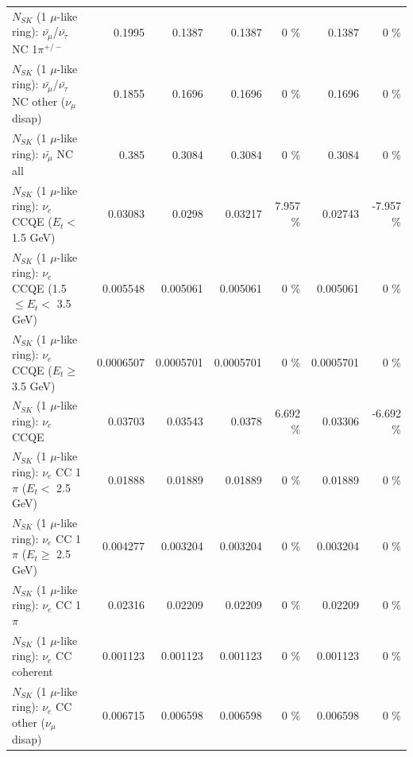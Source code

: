 \begin{table}
\begin{tabular}{| l | r | r | r  r | r  r |}
\hline
  $N_{SK}$ (1 $\mu$-like ring): $\bar{\nu_\mu}$/$\bar{\nu_\tau}$ NC 1$\pi^{+/-}$ &          0.1995 &          0.1387 &          0.1387 &        0 \%  &          0.1387 &        0 \%  \\ 
$N_{SK}$ (1 $\mu$-like ring): $\bar{\nu_\mu}$/$\bar{\nu_\tau}$ NC other ($\nu_\mu$ disap) &          0.1855 &          0.1696 &          0.1696 &        0 \%  &          0.1696 &        0 \%  \\ 
                          $N_{SK}$ (1 $\mu$-like ring): $\bar{\nu_{\mu}}$ NC all &           0.385 &          0.3084 &          0.3084 &        0 \%  &          0.3084 &        0 \%  \\ 
\hline
\hline
\hline
                  $N_{SK}$ (1 $\mu$-like ring): $\nu_e$ CCQE ($E_{t} <$ 1.5 GeV) &         0.03083 &          0.0298 &         0.03217 &    7.957 \%  &         0.02743 &   -7.957 \%  \\ 
         $N_{SK}$ (1 $\mu$-like ring): $\nu_e$ CCQE (1.5 $\leq E_{t} <$ 3.5 GeV) &        0.005548 &        0.005061 &        0.005061 &        0 \%  &        0.005061 &        0 \%  \\ 
               $N_{SK}$ (1 $\mu$-like ring): $\nu_e$ CCQE ($E_{t} \geq$ 3.5 GeV) &       0.0006507 &       0.0005701 &       0.0005701 &        0 \%  &       0.0005701 &        0 \%  \\ 
\hline
                                      $N_{SK}$ (1 $\mu$-like ring): $\nu_e$ CCQE &         0.03703 &         0.03543 &          0.0378 &    6.692 \%  &         0.03306 &   -6.692 \%  \\ 
\hline
             $N_{SK}$ (1 $\mu$-like ring): $\nu_e$ CC 1$\pi$ ($E_{t} <$ 2.5 GeV) &         0.01888 &         0.01889 &         0.01889 &        0 \%  &         0.01889 &        0 \%  \\ 
          $N_{SK}$ (1 $\mu$-like ring): $\nu_e$ CC 1$\pi$ ($E_{t} \geq$ 2.5 GeV) &        0.004277 &        0.003204 &        0.003204 &        0 \%  &        0.003204 &        0 \%  \\ 
\hline
                                 $N_{SK}$ (1 $\mu$-like ring): $\nu_e$ CC 1$\pi$ &         0.02316 &         0.02209 &         0.02209 &        0 \%  &         0.02209 &        0 \%  \\ 
                               $N_{SK}$ (1 $\mu$-like ring): $\nu_e$ CC coherent &        0.001123 &        0.001123 &        0.001123 &        0 \%  &        0.001123 &        0 \%  \\ 
                $N_{SK}$ (1 $\mu$-like ring): $\nu_e$ CC other ($\nu_\mu$ disap) &        0.006715 &        0.006598 &        0.006598 &        0 \%  &        0.006598 &        0 \%  \\ 

\end{tabular}
\end{table}
